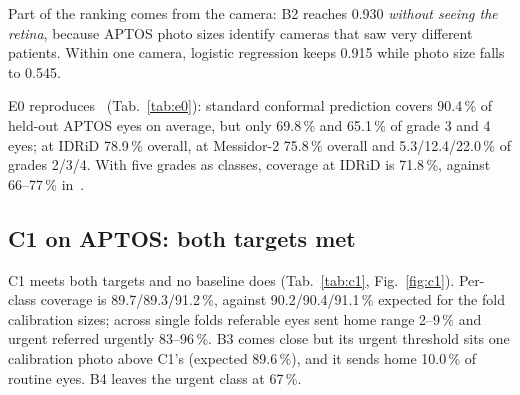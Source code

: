 \documentclass[10pt,twocolumn,letterpaper]{article}
\newcommand{\pct}{\,\%}
\begin{document}
Part of the ranking comes from the camera: B2 reaches 0.930 \emph{without seeing the retina}, because APTOS photo sizes identify cameras that saw very different patients. Within one camera, logistic regression keeps 0.915 while photo size falls to 0.545.

E0 reproduces~\cite{hasan} (Tab.~\ref{tab:e0}): standard conformal prediction covers 90.4\pct{} of held-out APTOS eyes on average, but only 69.8\pct{} and 65.1\pct{} of grade 3 and 4 eyes; at IDRiD 78.9\pct{} overall, at Messidor-2 75.8\pct{} overall and 5.3/12.4/22.0\pct{} of grades 2/3/4. With five grades as classes, coverage at IDRiD is 71.8\pct, against 66--77\pct{} in~\cite{hasan}.

\subsection{C1 on APTOS: both targets met}
\begin{table}[t]\centering\small
{}
\caption{C1 against baselines on APTOS (\%, logistic regression, $\alpha=0.1$, pooled over 10 held-out folds). Ref.\ home: referable eyes sent home; Urg.\ urgent: urgent eyes referred urgently; /1000: referrals per 1,000 eyes at APTOS prevalence.}\label{tab:c1}
\end{table}
C1 meets both targets and no baseline does (Tab.~\ref{tab:c1}, Fig.~\ref{fig:c1}). Per-class coverage is 89.7/89.3/91.2\pct, against 90.2/90.4/91.1\pct{} expected for the fold calibration sizes; across single folds referable eyes sent home range 2--9\pct{} and urgent referred urgently 83--96\pct. B3 comes close but its urgent threshold sits one calibration photo above C1's (expected 89.6\pct), and it sends home 10.0\pct{} of routine eyes. B4 leaves the urgent class at 67\pct.
\end{document}
